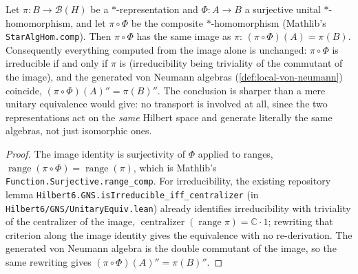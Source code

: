 \begin{lemma}
    \label{lmm:pullback-image-invariants}
    \leanok
    Let $\pi : B \to \mathcal{B}(H)$ be a $*$-representation and $\Phi : A \to B$ a surjective unital $*$-homomorphism, and let $\pi \circ \Phi$ be the composite $*$-homomorphism (Mathlib's \texttt{StarAlgHom.comp}). Then $\pi \circ \Phi$ has the same image as $\pi$: $(\pi \circ \Phi)(A) = \pi(B)$. Consequently everything computed from the image alone is unchanged: $\pi \circ \Phi$ is irreducible if and only if $\pi$ is (irreducibility being triviality of the commutant of the image), and the generated von Neumann algebras (\ref{def:local-von-neumann}) coincide, $(\pi \circ \Phi)(A)'' = \pi(B)''$. The conclusion is sharper than a mere unitary equivalence would give: no transport is involved at all, since the two representations act on the \emph{same} Hilbert space and generate literally the same algebras, not just isomorphic ones.
\end{lemma}
\begin{proof}
    \leanok
    The image identity is surjectivity of $\Phi$ applied to ranges, $\operatorname{range}(\pi \circ \Phi) = \operatorname{range}(\pi)$, which is Mathlib's \texttt{Function.Surjective.range\_comp}. For irreducibility, the existing repository lemma \texttt{Hilbert6.GNS.isIrreducible\_iff\_centralizer} (in \texttt{Hilbert6/GNS/UnitaryEquiv.lean}) already identifies irreducibility with triviality of the centralizer of the image, $\operatorname{centralizer}(\operatorname{range} \pi) = \mathbb{C} \cdot 1$; rewriting that criterion along the image identity gives the equivalence with no re-derivation. The generated von Neumann algebra is the double commutant of the image, so the same rewriting gives $(\pi \circ \Phi)(A)'' = \pi(B)''$.
\end{proof}

